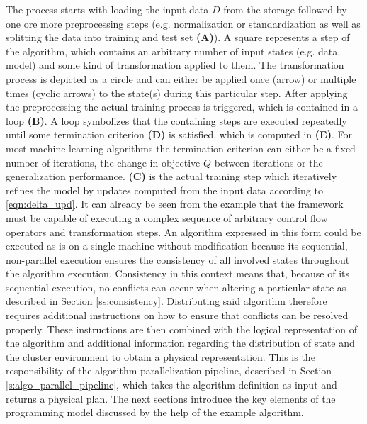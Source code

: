 The process starts with loading the input data $D$ from the storage followed by one ore more preprocessing steps (e.g. normalization or standardization as well as splitting the data into training and test set \textbf{(A)}).
A square represents a step of the algorithm, which contains an arbitrary number of input states (e.g. data, model) and some kind of transformation applied to them.
The transformation process is depicted as a circle and can either be applied once (arrow) or multiple times (cyclic arrows) to the state(s) during this particular step.
After applying the preprocessing the actual training process is triggered, which is contained in a loop \textbf{(B)}.
A loop symbolizes that the containing steps are executed repeatedly until some termination criterion \textbf{(D)} is satisfied, which is computed in \textbf{(E)}.
For most machine learning algorithms the termination criterion can either be a fixed number of iterations, the change in objective $Q$ between iterations or the generalization performance.
\textbf{(C)} is the actual training step which iteratively refines the model by updates computed from the input data according to \ref{eqn:delta_upd}.
It can already be seen from the example that the framework must be capable of executing a complex sequence of arbitrary control flow operators and transformation steps.
An algorithm expressed in this form could be executed as is on a single machine without modification because its sequential, non-parallel execution ensures the consistency of all involved states throughout the algorithm execution.
Consistency in this context means that, because of its sequential execution, no conflicts can occur when altering a particular state as described in Section \ref{ss:consistency}.
Distributing said algorithm therefore requires additional instructions on how to ensure that conflicts can be resolved properly.
These instructions are then combined with the logical representation of the algorithm and additional information regarding the distribution of state and the cluster environment to obtain a physical representation.
This is the responsibility of the algorithm parallelization pipeline, described in Section \ref{s:algo_parallel_pipeline}, which takes the algorithm definition as input and returns a physical plan.
The next sections introduce the key elements of the programming model discussed by the help of the example algorithm.

